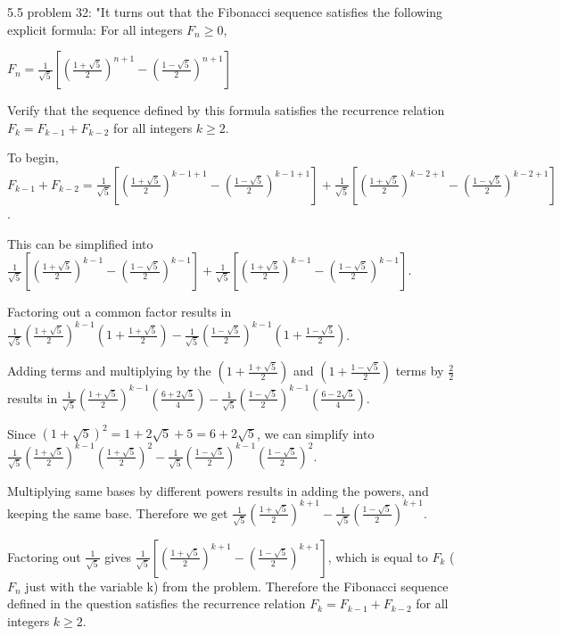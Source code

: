 \documentclass{article}
\begin{document}
\clearpage
\header

\item 5.5 problem 32: "It turns out that the Fibonacci sequence satisfies the following explicit formula: For all integers $F_n \geq 0$,

\item $F_n = \frac{1}{\sqrt{5}}[(\frac{1 + \sqrt{5}}{2})^{n+1} - (\frac{1 - \sqrt{5}}{2})^{n+1}]$

\item Verify that the sequence defined by this formula satisfies the recurrence relation $F_k = F_{k-1}+F_{k-2}$ for all integers $k\geq2$.

\item To begin, $F_{k-1}+F_{k-2} = \frac{1}{\sqrt{5}}[(\frac{1 + \sqrt{5}}{2})^{k-1+1} - (\frac{1 - \sqrt{5}}{2})^{k-1+1}] + \frac{1}{\sqrt{5}}[(\frac{1 + \sqrt{5}}{2})^{k-2+1} - (\frac{1 - \sqrt{5}}{2})^{k-2+1}]$.
\item This can be simplified into $ \frac{1}{\sqrt{5}}[(\frac{1 + \sqrt{5}}{2})^{k-1} - (\frac{1 - \sqrt{5}}{2})^{k-1}] + \frac{1}{\sqrt{5}}[(\frac{1 + \sqrt{5}}{2})^{k-1} - (\frac{1 - \sqrt{5}}{2})^{k-1}]$.
\item Factoring out a common factor results in $ \frac{1}{\sqrt{5}}(\frac{1 + \sqrt{5}}{2})^{k-1}(1 + \frac{1 + \sqrt{5}}{2}) - \frac{1}{\sqrt{5}}(\frac{1 - \sqrt{5}}{2})^{k-1}(1 + \frac{1 - \sqrt{5}}{2})$.
\item Adding terms and multiplying by the $(1 + \frac{1 + \sqrt{5}}{2})$ and $(1 + \frac{1 - \sqrt{5}}{2})$ terms by $\frac{2}{2}$ results in $ \frac{1}{\sqrt{5}}(\frac{1 + \sqrt{5}}{2})^{k-1}(\frac{6 + 2\sqrt{5}}{4}) - \frac{1}{\sqrt{5}}(\frac{1 - \sqrt{5}}{2})^{k-1}(\frac{6 - 2\sqrt{5}}{4})$.
\item Since $(1+\sqrt{5})^2 = 1 + 2\sqrt{5} + 5 = 6 + 2\sqrt{5}$, we can simplify into $ \frac{1}{\sqrt{5}}(\frac{1 + \sqrt{5}}{2})^{k-1}(\frac{1 + \sqrt{5}}{2})^2 - \frac{1}{\sqrt{5}}(\frac{1 - \sqrt{5}}{2})^{k-1}(\frac{1 - \sqrt{5}}{2})^2$.
\item Multiplying same bases by different powers results in adding the powers, and keeping the same base. Therefore we get $ \frac{1}{\sqrt{5}}(\frac{1 + \sqrt{5}}{2})^{k+1} - \frac{1}{\sqrt{5}}(\frac{1 - \sqrt{5}}{2})^{k+1}.$ 
\item Factoring out $\frac{1}{\sqrt{5}}$ gives $\frac{1}{\sqrt{5}}[(\frac{1 + \sqrt{5}}{2})^{k+1} - (\frac{1 - \sqrt{5}}{2})^{k+1}]$, which is equal to $F_k$ ($F_n$ just with the variable k) from the problem. Therefore the Fibonacci sequence defined in the question satisfies the recurrence relation $F_k = F_{k-1}+F_{k-2}$ for all integers $k\geq2$.
\end{document}
